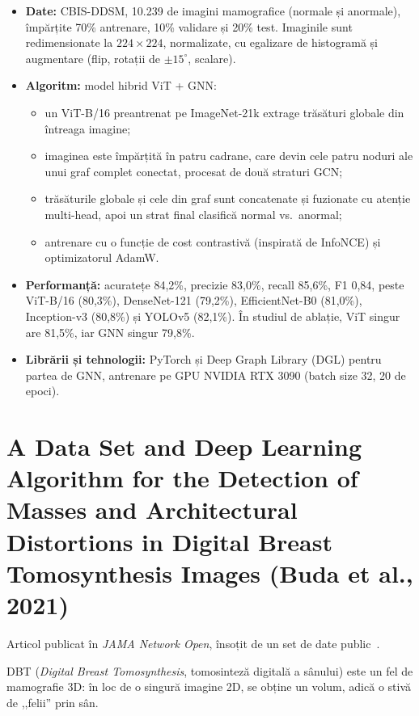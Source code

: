 \documentclass[runningheads,a4paper,11pt]{report}
\begin{document}
\begin{itemize}
	\item \textbf{Date:} CBIS-DDSM, 10.239 de imagini mamografice (normale și anormale), împărțite 70\% antrenare, 10\% validare și 20\% test. Imaginile sunt redimensionate la $224 \times 224$, normalizate, cu egalizare de histogramă și augmentare (flip, rotații de $\pm 15^{\circ}$, scalare).
	\item \textbf{Algoritm:} model hibrid ViT + GNN:
	\begin{itemize}
		\item un ViT-B/16 preantrenat pe ImageNet-21k extrage trăsături globale din întreaga imagine;
		\item imaginea este împărțită în patru cadrane, care devin cele patru noduri ale unui graf complet conectat, procesat de două straturi GCN;
		\item trăsăturile globale și cele din graf sunt concatenate și fuzionate cu atenție multi-head, apoi un strat final clasifică normal vs.\ anormal;
		\item antrenare cu o funcție de cost contrastivă (inspirată de InfoNCE) și optimizatorul AdamW.
	\end{itemize}
	\item \textbf{Performanță:} acuratețe 84,2\%, precizie 83,0\%, recall 85,6\%, F1 0,84, peste ViT-B/16 (80,3\%), DenseNet-121 (79,2\%), EfficientNet-B0 (81,0\%), Inception-v3 (80,8\%) și YOLOv5 (82,1\%). În studiul de ablație, ViT singur are 81,5\%, iar GNN singur 79,8\%.
	\item \textbf{Librării și tehnologii:} PyTorch și Deep Graph Library (DGL) pentru partea de GNN, antrenare pe GPU NVIDIA RTX 3090 (batch size 32, 20 de epoci).
\end{itemize}

\section{A Data Set and Deep Learning Algorithm for the Detection of Masses and Architectural Distortions in Digital Breast Tomosynthesis Images (Buda et al., 2021)}
\label{section:buda}

Articol publicat în \emph{JAMA Network Open}, însoțit de un set de date public~\cite{buda2021}.

DBT (\emph{Digital Breast Tomosynthesis}, tomosinteză digitală a sânului) este un fel de mamografie 3D: în loc de o singură imagine 2D, se obține un volum, adică o stivă de ,,felii'' prin sân.
\end{document}
